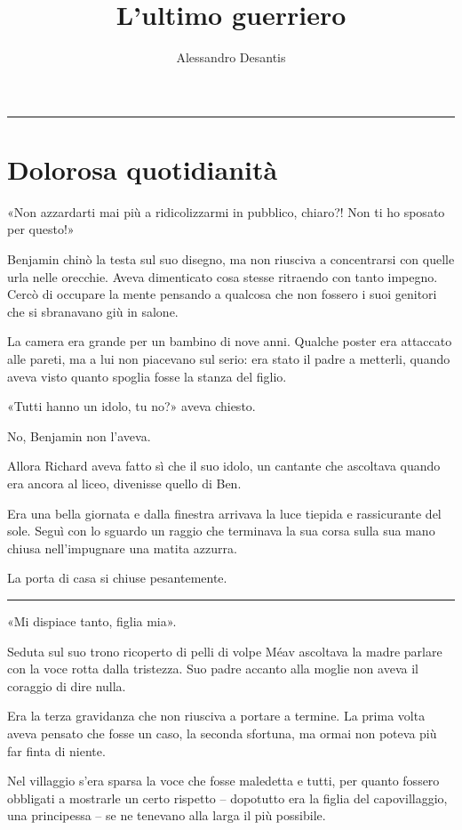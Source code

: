 \documentclass[a4paper,11pt,oneside,openright,final]{memoir}
\title{L'ultimo guerriero}
\author{Alessandro Desantis}
\makeatletter
\renewcommand{\maketitle}{\begin{titlingpage}%
    \let\footnotesize\small
    \let\footnoterule\relax
    \parindent \z@
    \reset@font
    \null\vfil
    \begin{flushleft}
      \huge \@title
    \end{flushleft}
    \par
    \hrule height 1pt
    \par
    \begin{flushright}
      \LARGE \@author \par
    \end{flushright}
    \vskip 60\p@
    \vfil\null
  \end{titlingpage}%
  \setcounter{footnote}{0}%
}
\makeatother
\begin{document}
\maketitle

\chapter{Dolorosa quotidianità}

«Non azzardarti mai più a ridicolizzarmi in pubblico, chiaro?! Non ti ho
sposato per questo!»

Benjamin chinò la testa sul suo disegno, ma non riusciva a concentrarsi con
quelle urla nelle orecchie. Aveva dimenticato cosa stesse ritraendo con tanto
impegno. Cercò di occupare la mente pensando a qualcosa che non fossero i suoi
genitori che si sbranavano giù in salone.

La camera era grande per un bambino di nove anni. Qualche poster era attaccato
alle pareti, ma a lui non piacevano sul serio: era stato il padre a metterli,
quando aveva visto quanto spoglia fosse la stanza del figlio.

«Tutti hanno un idolo, tu no?» aveva chiesto.

No, Benjamin non l’aveva.

Allora Richard aveva fatto sì che il suo idolo, un cantante che ascoltava
quando era ancora al liceo, divenisse quello di Ben.

Era una bella giornata e dalla finestra arrivava la luce tiepida e rassicurante
del sole. Seguì con lo sguardo un raggio che terminava la sua corsa sulla sua
mano chiusa nell’impugnare una matita azzurra.

La porta di casa si chiuse pesantemente.

\plainbreak{1}

«Mi dispiace tanto, figlia mia».

Seduta sul suo trono ricoperto di pelli di volpe Méav ascoltava la madre
parlare con la voce rotta dalla tristezza. Suo padre accanto alla moglie non
aveva il coraggio di dire nulla.

Era la terza gravidanza che non riusciva a portare a termine. La prima volta
aveva pensato che fosse un caso, la seconda sfortuna, ma ormai non poteva più
far finta di niente.

Nel villaggio s'era sparsa la voce che fosse maledetta e tutti, per quanto
fossero obbligati a mostrarle un certo rispetto -- dopotutto era la figlia del
capovillaggio, una principessa -- se ne tenevano alla larga il più possibile.
\end{document}
